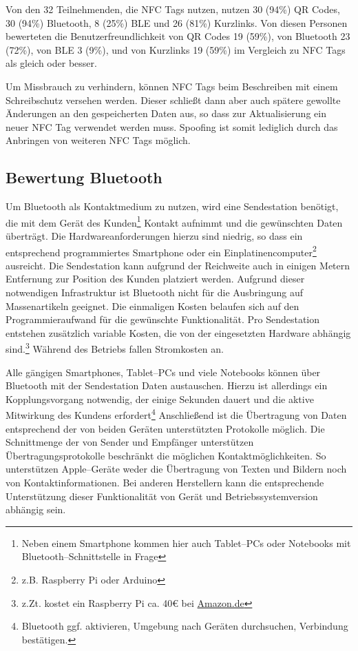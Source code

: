 Von den 32 Teilnehmenden, die NFC Tags nutzen, nutzen 30 (94\%) QR Codes, 30 (94\%) Bluetooth, 8 (25\%) \ac{BLE} und 26 (81\%) Kurzlinks. Von diesen Personen bewerteten die  Benutzerfreundlichkeit von QR Codes 19 (59\%), von Bluetooth 23 (72\%), von \ac{BLE} 3 (9\%), und von Kurzlinks 19 (59\%) im Vergleich zu NFC Tags als gleich oder besser.

Um Missbrauch zu verhindern, können NFC Tags beim Beschreiben mit einem Schreibschutz versehen werden. Dieser schließt dann aber auch spätere gewollte Änderungen an den gespeicherten Daten aus, so dass zur Aktualisierung ein neuer NFC Tag verwendet werden muss. Spoofing ist somit lediglich durch das Anbringen von weiteren NFC Tags möglich.

\subsection{Bewertung Bluetooth} %
\label{sub:bewertung_bluetooth}
Um Bluetooth als Kontaktmedium zu nutzen, wird eine Sendestation benötigt, die mit dem Gerät des Kunden\footnote{Neben einem Smartphone kommen hier auch Tablet–PCs oder Notebooks mit Bluetooth–Schnittstelle in Frage} Kontakt aufnimmt und die gewünschten Daten überträgt. Die Hardwareanforderungen hierzu sind niedrig, so dass ein entsprechend programmiertes Smartphone oder ein Einplatinencomputer\footnote{z.B. Raspberry Pi oder Arduino} ausreicht. Die Sendestation kann aufgrund der Reichweite auch in einigen Metern Entfernung zur Position des Kunden platziert werden. Aufgrund dieser notwendigen Infrastruktur ist Bluetooth nicht für die Ausbringung auf Massenartikeln geeignet. Die einmaligen Kosten belaufen sich auf den Programmieraufwand für die gewünschte Funktionalität. Pro Sendestation entstehen zusätzlich variable Kosten, die von der eingesetzten Hardware abhängig sind.\footnote{z.Zt. kostet ein Raspberry Pi ca. 40€ bei \url{Amazon.de}} Während des Betriebs fallen Stromkosten an.

Alle gängigen Smartphones, Tablet–PCs und viele Notebooks können über Bluetooth mit der Sendestation Daten austauschen. Hierzu ist allerdings ein Kopplungsvorgang notwendig, der einige Sekunden dauert und die aktive Mitwirkung des Kundens erfordert\footnote{Bluetooth ggf. aktivieren, Umgebung nach Geräten durchsuchen, Verbindung bestätigen.} Anschließend ist die Übertragung von Daten entsprechend der von beiden Geräten unterstützten Protokolle möglich. Die Schnittmenge der von Sender und Empfänger unterstützen Übertragungsprotokolle beschränkt die möglichen Kontaktmöglichkeiten. So unterstützen Apple–Geräte weder die Übertragung von Texten und Bildern noch von Kontaktinformationen. Bei anderen Herstellern kann die entsprechende Unterstützung dieser Funktionalität von Gerät und Betriebssystemversion abhängig sein.

